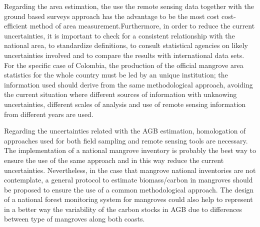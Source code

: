 \documentclass[review, authoryear]{elsarticle}   	%
\DeclareRobustCommand{\Jhoa}{\todo[author=Jhoa, inline, color=yellow!40, size=\small]}
\begin{document}
%
Regarding the area estimation, the use the remote sensing data together with the ground based surveys approach  \citep{IPCC2003} has the advantage to be the most cost cost-efficient method of area measurement.Furthermore, in order to reduce the current uncertainties, it is important to check for a consistent relationship with the national area, to standardize definitions, to consult statistical agencies on likely uncertainties involved and to compare the results with international data sets. For the specific case of Colombia, the production of the official mangrove area statistics for the whole country must be led by an unique institution; the information used should derive from the same methodological approach, avoiding the current situation where different sources of information with unknowing uncertainties, different scales of analysis and use of remote sensing information from different years are used.

%
%
Regarding the uncertainties related with the AGB estimation, homologation of approaches used for both field sampling and remote sensing tools are necessary. The implementation of a national mangrove inventory is probably the best way to ensure the use of the same approach and in this way reduce the current uncertainties. Nevertheless, in the case that mangrove national inventories are not contemplate, a general protocol to estimate biomass/carbon in mangroves should be proposed to ensure the use of a common methodological approach. The design of a national forest monitoring system for mangroves could also help to represent in a better way the variability of the carbon stocks in AGB due to differences between type of mangroves along both coasts. %
%
\end{document}

